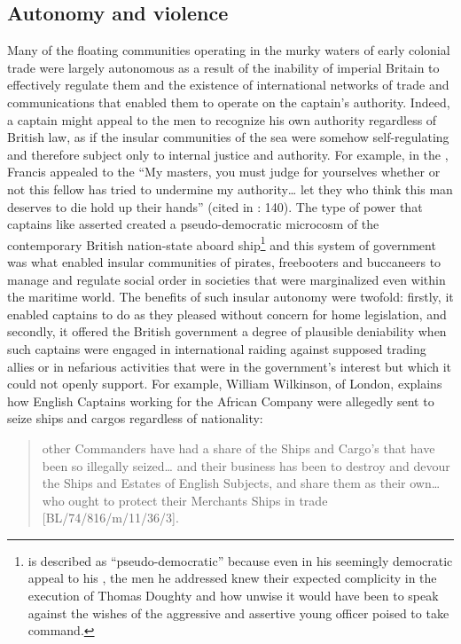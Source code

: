 \subsection{{Autonomy and violence}}\label{sec:4.2.2}

Many of the floating communities operating in the murky waters of early colonial trade were largely autonomous as a result of the inability of imperial Britain to effectively regulate them and the existence of international networks of  trade and communications that enabled them to operate on the captain’s authority. Indeed, a captain might appeal to the men to recognize his own authority regardless of British law, as if the insular communities of the sea were somehow self-regulating and therefore subject only to internal justice and authority. For example, in the , Francis  appealed to the  “My masters, you must judge for yourselves whether or not this fellow has tried to undermine my authority… let they who think this man deserves to die hold up their hands” (cited in \citealt{Bicheno2012}: 140). The type of power that captains like  asserted created a pseudo-democratic microcosm of the contemporary British nation-state aboard ship\footnote{ is described as “pseudo-democratic” because even in his seemingly democratic appeal to his , the men he addressed knew their expected complicity in the execution of Thomas Doughty and how unwise it would have been to speak against the wishes of the aggressive and assertive young officer poised to take command.}  and this system of government was what enabled insular communities of pirates, freebooters and buccaneers to manage and regulate social order in societies that were marginalized even within the maritime world. The benefits of such insular autonomy were twofold: firstly, it enabled captains to do as they pleased without concern for home legislation, and secondly, it offered the British government a degree of plausible deniability when such captains were engaged in international raiding against supposed trading allies or in nefarious activities that were in the government’s interest but which it could not openly support. For example, William Wilkinson,  of London, explains how English Captains working for the African Company were allegedly sent to seize  ships and cargos regardless of nationality: 

\begin{quotation}
other Commanders have had a share of the Ships and Cargo’s that have been so illegally seized… and their business has been to destroy and devour the Ships and Estates of English Subjects, and share them as their own… who ought to protect their Merchants Ships in trade [BL/74/816/m/11/36/3]. 
\end{quotation}

